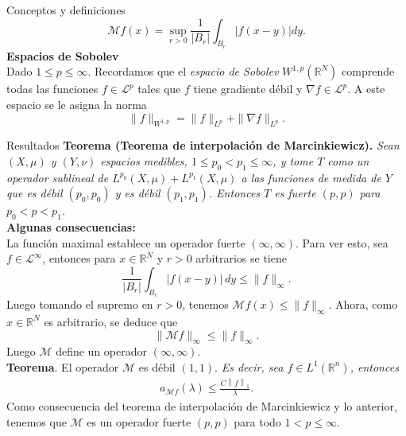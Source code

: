 \documentclass[final]{beamer}
\providecommand{\norm}[1]{\left\|#1\right\|}
\newlength{\colwidth}
\begin{document}
\begin{frame}[t]
\begin{columns}[t]
\begin{column}{\colwidth}
\begin{block}{Conceptos y definiciones}
			$$\mathcal{M}f(x)=\sup_{r>0}\frac{1}{|B_r|}\int_{B_r}|f(x-y)|dy.$$
    \textbf{Espacios de Sobolev}\\
      Dado $1\leq p\leq \infty$. Recordamos que el \emph{espacio de Sobolev} $W^{1,p}(\mathbb{R}^N)$ comprende todas las funciones $f\in \mathcal{L}^p$ tales que $f$ tiene gradiente débil y $\nabla f\in \mathcal{L}^p$. A este espacio se le asigna la norma
          \begin{equation*}
              \|f\|_{W^{1,p}}=\|f\|_{L^p}+\|\nabla f\|_{L^p}.
          \end{equation*}
  \end{block}

  \begin{alertblock}{Resultados}
    \textbf{Teorema (Teorema de interpolación de Marcinkiewicz).} \emph{Sean $(X, \mu)$ y $(Y, \nu)$ espacios medibles, $1 \leq p_0<p_1 \leq \infty$, y tome $T$ como un operador sublineal de $L^{p_0}(X, \mu)+L^{p_1}(X, \mu)$ a las funciones de medida de $Y$ que es débil $\left(p_0, p_0\right)$ y es débil $\left(p_1, p_1\right)$. Entonces $T$ es fuerte $(p, p)$ para $p_0<p<p_1$.}\\
      \vspace{0.2cm}
      {\bf Algunas consecuencias:}\\
      La función maximal establece un operador fuerte $(\infty,\infty)$. Para ver esto, sea $f\in \mathcal{L}^{\infty}$, entonces para $x\in \mathbb{R}^N$ y $r>0$ arbitrarios se tiene
      \begin{equation*}
        \frac{1}{|B_r|}\int_{B_r} |f(x-y)|\, dy \leq \|f\|_{\infty}.
      \end{equation*}
      Luego tomando el supremo en $r>0$, tenemos $\mathcal{M}f(x)\leq \|f\|_{\infty}$. Ahora, como $x\in \mathbb{R}^N$ es arbitrario, se deduce que
      \begin{equation*}
        \|\mathcal{M}f\|_{\infty}\leq \|f\|_{\infty}.   
      \end{equation*}
      Luego $\mathcal{M}$ define un operador $(\infty,\infty)$.\\
      \vspace{0.2cm}
      {\bf Teorema}. {El operador $\mathcal{M}$ es débil $(1,1)$.} \emph{Es decir, sea $f\in L^{1}(\mathbb{R}^{n})$, entonces
      \begin{align*}
        a_{\mathcal{M}f}(\lambda)\leq \frac{C\norm{f}_{1}}{\lambda}.
      \end{align*}}
      \vspace{0.2cm}
      Como consecuencia del teorema de interpolación de Marcinkiewicz y lo anterior, tenemos que $\mathcal{M}$ es un operador fuerte $(p,p)$ para todo $1<p\leq \infty$.\\

\end{alertblock}
\end{column}
\end{columns}
\end{frame}
\end{document}
